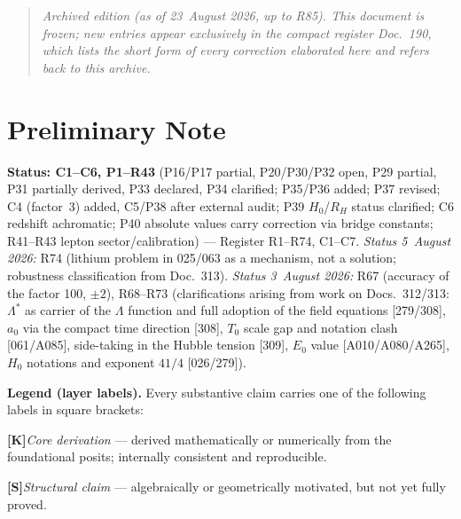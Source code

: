 
\begin{quote}\itshape Archived edition (as of 23~August 2026, up to R85). This document is frozen; new entries appear exclusively in the compact register Doc.~190, which lists the short form of every correction elaborated here and refers back to this archive.\end{quote}

\section*{Preliminary Note}

\textbf{Status: C1--C6, P1--R43} (P16/P17 partial, P20/P30/P32 open, P29 partial, P31 partially derived, P33 declared, P34 clarified; P35/P36 added; P37 revised; C4 (factor~3) added, C5/P38 after external audit; P39 $H_0$/$R_H$ status clarified; C6 redshift achromatic; P40 absolute values carry correction via bridge constants; R41--R43 lepton sector/calibration) --- Register R1--R74, C1--C7. \emph{Status 5~August 2026:} R74 (lithium problem in 025/063 as a mechanism, not a solution; robustness classification from Doc.~313). \emph{Status 3~August 2026:} R67 (accuracy of the factor 100, $\pm2$), R68--R73 (clarifications arising from work on Docs.~312/313: $\Lambda^{*}$ as carrier of the $\Lambda$ function and full adoption of the field equations [279/308], $a_0$ via the compact time direction [308], $T_0$ scale gap and notation clash [061/A085], side-taking in the Hubble tension [309], $E_0$ value [A010/A080/A265], $H_0$ notations and exponent $41/4$ [026/279]).

\medskip
\noindent\textbf{Legend (layer labels).}
Every substantive claim carries one of the following labels in square brackets:

\smallskip
\smallskip\noindent \textbf{[K]}\quad \emph{Core derivation} — derived mathematically or numerically from the foundational posits; internally consistent and reproducible.

\smallskip\noindent \textbf{[S]}\quad \emph{Structural claim} — algebraically or geometrically motivated, but not yet fully proved.

